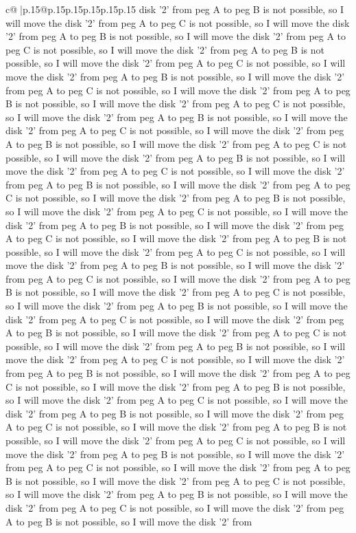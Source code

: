 \documentclass{article}
\begin{document}
{\begin{supertabular}{c@{$\;$}|p{.15\linewidth}@{}p{.15\linewidth}p{.15\linewidth}p{.15\linewidth}p{.15\linewidth}p{.15\linewidth}}
{{{disk '2' from peg A to peg B is not possible, so I will move the disk '2' from peg A to peg C is not possible, so I will move the disk '2' from peg A to peg B is not possible, so I will move the disk '2' from peg A to peg C is not possible, so I will move the disk '2' from peg A to peg B is not possible, so I will move the disk '2' from peg A to peg C is not possible, so I will move the disk '2' from peg A to peg B is not possible, so I will move the disk '2' from peg A to peg C is not possible, so I will move the disk '2' from peg A to peg B is not possible, so I will move the disk '2' from peg A to peg C is not possible, so I will move the disk '2' from peg A to peg B is not possible, so I will move the disk '2' from peg A to peg C is not possible, so I will move the disk '2' from peg A to peg B is not possible, so I will move the disk '2' from peg A to peg C is not possible, so I will move the disk '2' from peg A to peg B is not possible, so I will move the disk '2' from peg A to peg C is not possible, so I will move the disk '2' from peg A to peg B is not possible, so I will move the disk '2' from peg A to peg C is not possible, so I will move the disk '2' from peg A to peg B is not possible, so I will move the disk '2' from peg A to peg C is not possible, so I will move the disk '2' from peg A to peg B is not possible, so I will move the disk '2' from peg A to peg C is not possible, so I will move the disk '2' from peg A to peg B is not possible, so I will move the disk '2' from peg A to peg C is not possible, so I will move the disk '2' from peg A to peg B is not possible, so I will move the disk '2' from peg A to peg C is not possible, so I will move the disk '2' from peg A to peg B is not possible, so I will move the disk '2' from peg A to peg C is not possible, so I will move the disk '2' from peg A to peg B is not possible, so I will move the disk '2' from peg A to peg C is not possible, so I will move the disk '2' from peg A to peg B is not possible, so I will move the disk '2' from peg A to peg C is not possible, so I will move the disk '2' from peg A to peg B is not possible, so I will move the disk '2' from peg A to peg C is not possible, so I will move the disk '2' from peg A to peg B is not possible, so I will move the disk '2' from peg A to peg C is not possible, so I will move the disk '2' from peg A to peg B is not possible, so I will move the disk '2' from peg A to peg C is not possible, so I will move the disk '2' from peg A to peg B is not possible, so I will move the disk '2' from peg A to peg C is not possible, so I will move the disk '2' from peg A to peg B is not possible, so I will move the disk '2' from peg A to peg C is not possible, so I will move the disk '2' from peg A to peg B is not possible, so I will move the disk '2' from peg A to peg C is not possible, so I will move the disk '2' from peg A to peg B is not possible, so I will move the disk '2' from peg A to peg C is not possible, so I will move the disk '2' from peg A to peg B is not possible, so I will move the disk '2' from peg A to peg C is not possible, so I will move the disk '2' from peg A to peg B is not possible, so I will move the disk '2' from }}}
\end{supertabular}}
\end{document}
